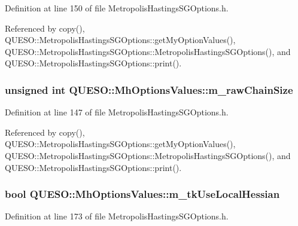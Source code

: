 Definition at line 150 of file Metropolis\-Hastings\-S\-G\-Options.\-h.



Referenced by copy(), Q\-U\-E\-S\-O\-::\-Metropolis\-Hastings\-S\-G\-Options\-::get\-My\-Option\-Values(), Q\-U\-E\-S\-O\-::\-Metropolis\-Hastings\-S\-G\-Options\-::\-Metropolis\-Hastings\-S\-G\-Options(), and Q\-U\-E\-S\-O\-::\-Metropolis\-Hastings\-S\-G\-Options\-::print().

\hypertarget{class_q_u_e_s_o_1_1_mh_options_values_a18dcb5898ba7101ae11856e866742aaf}{
\subsubsection[{m\-\_\-raw\-Chain\-Size}]{\setlength{\rightskip}{0pt plus 5cm}unsigned int Q\-U\-E\-S\-O\-::\-Mh\-Options\-Values\-::m\-\_\-raw\-Chain\-Size}}\label{class_q_u_e_s_o_1_1_mh_options_values_a18dcb5898ba7101ae11856e866742aaf}


Definition at line 147 of file Metropolis\-Hastings\-S\-G\-Options.\-h.



Referenced by copy(), Q\-U\-E\-S\-O\-::\-Metropolis\-Hastings\-S\-G\-Options\-::get\-My\-Option\-Values(), Q\-U\-E\-S\-O\-::\-Metropolis\-Hastings\-S\-G\-Options\-::\-Metropolis\-Hastings\-S\-G\-Options(), and Q\-U\-E\-S\-O\-::\-Metropolis\-Hastings\-S\-G\-Options\-::print().

\hypertarget{class_q_u_e_s_o_1_1_mh_options_values_a3fa3d465b07ea276e7b2aa68b897e4ec}{
\subsubsection[{m\-\_\-tk\-Use\-Local\-Hessian}]{\setlength{\rightskip}{0pt plus 5cm}bool Q\-U\-E\-S\-O\-::\-Mh\-Options\-Values\-::m\-\_\-tk\-Use\-Local\-Hessian}}\label{class_q_u_e_s_o_1_1_mh_options_values_a3fa3d465b07ea276e7b2aa68b897e4ec}


Definition at line 173 of file Metropolis\-Hastings\-S\-G\-Options.\-h.



